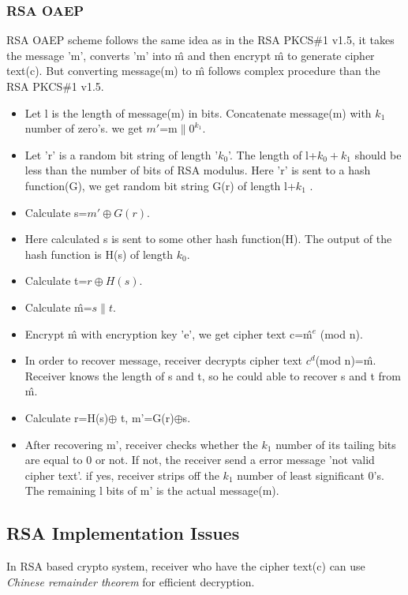\documentclass{article}
\begin{document}
 \subsubsection{RSA OAEP }
 RSA OAEP scheme follows the same idea as in the RSA PKCS\#1 v1.5, it takes the message 'm', converts 'm' into \^{m}  and then encrypt \^{m} to generate cipher text(c). But converting message(m) to \^{m} follows complex procedure than the RSA PKCS\#1 v1.5.
 
 \begin{itemize}
 	\item Let l is the length of message(m) in bits. Concatenate message(m) with $k_{1}$ number of zero's.
 	 we get $m'$=m$\parallel$$0^{k_{1}}$.
 	 \item Let 'r' is a random bit string of length '$k_{0}$'. The length of l+$k_{0}+k_{1}$ should be less than the number of bits of RSA modulus. Here 'r' is sent to a hash function(G), we get random bit string G(r) of length l+$k_{1}$ .
 	 \item Calculate s=$m'\oplus G(r)$.
 	 \item Here calculated s is sent to some other hash function(H). The output of the hash function is H(s) of length $k_{0}$.
 	 \item Calculate  t=$r\oplus H(s)$.
 	 \item Calculate \^{m}=$s\parallel t$.
 	 \item Encrypt \^{m} with encryption key 'e', we get cipher text c=\^m$^{e}$ (mod n).
 	 \item In order to recover message, receiver decrypts cipher text $c^{d}$(mod n)=\^{m}. Receiver knows the length of s and t, so he could able to recover s and t from \^{m}.
 	 \item Calculate r=H(s)$\oplus$ t, m'=G(r)$\oplus$s.
 	 \item After recovering m', receiver checks whether the $k_{1}$ number of its tailing bits are equal to 0 or not. If not, the receiver send a error message 'not valid cipher text'. if yes, receiver strips off the $k_{1}$ number of least significant 0's. The remaining l bits of m' is the actual message(m).
 	 
 \end{itemize}
 
 
 
  
 
 
 
 \subsection{RSA Implementation Issues }
  In RSA based crypto system, receiver who have the cipher text(c) can use \textit{Chinese remainder theorem} for efficient decryption.
 
\end{document}
